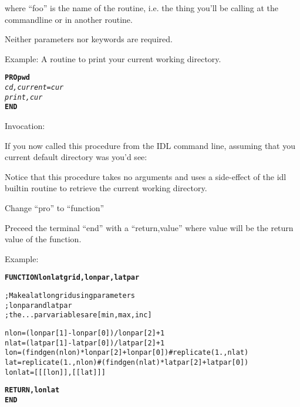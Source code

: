         where ``foo'' is the name of the routine, i.e. the thing
        you'll be calling at the commandline or in another routine.

        Neither parameters nor keywords are required.

        Example: A routine to print your current working directory.


\begin{alltt}
 \textbf{PRO pwd}
  \textit{cd, current=cur}
  \textit{print,cur}
 \textbf{END}
\end{alltt}



         Invocation:

        If you now called this procedure from the IDL command line,
        assuming that you current default directory was 
        you'd see:

        



        Notice that this procedure takes no arguments and uses a
        side-effect of the idl builtin routine  to
        retrieve the current working directory.


    \item {}

        Change ``pro'' to ``function''

        Preceed the terminal ``end'' with a ``return,value'' where
        value will be the return value of the function.

        Example:        



\begin{alltt}

\textbf{FUNCTION lonlatgrid, lonpar, latpar}

; Make a latlon grid using parameters 
; lonpar and latpar
; the ...par variables are [min,max,inc]

nlon=(lonpar[1]-lonpar[0])/lonpar[2] +1
nlat=(latpar[1]-latpar[0])/latpar[2] +1
lon = (findgen(nlon)*lonpar[2]+lonpar[0])#replicate(1.,nlat)
lat = replicate(1.,nlon)#(findgen(nlat)*latpar[2]+latpar[0])
lonlat=[ [[lon]], [[lat]] ]

\textbf{RETURN, lonlat}
\textbf{END}

\end{alltt}


